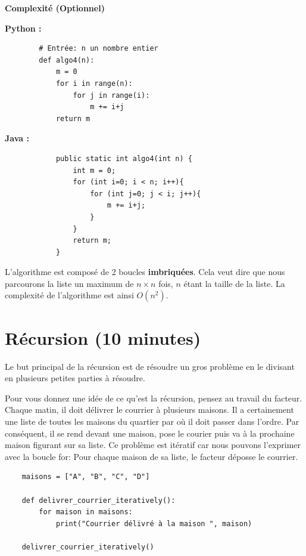 \begin{Exercice}[10 minutes] \textbf{Complexité (Optionnel)} \\        
        \item \textbf{Python :}
        \begin{verbatim}
        # Entrée: n un nombre entier
        def algo4(n):
            m = 0
            for i in range(n):
                for j in range(i):
                    m += i+j
            return m
        \end{verbatim}
        
        \textbf{Java :}
        \begin{verbatim}
            public static int algo4(int n) {
                int m = 0;
                for (int i=0; i < n; i++){
                    for (int j=0; j < i; j++){
                        m += i+j;
                    }
                }
                return m;
            }
        \end{verbatim}
    \begin{solution} 
    L'algorithme est composé de 2 boucles \textbf{imbriquées}. Cela veut dire que nous parcourons la liste un maximum de $n \times n$ fois, $n$ étant la taille de la liste. La complexité de l'algorithme est ainsi $O(n^2)$.
    \end{solution}
    
\end{Exercice}
    
        
\section{Récursion (10 minutes)}

Le but principal de la récursion est de résoudre un gros problème en le divisant en plusieurs petites parties à résoudre.

Pour vous donnez une idée de ce qu'est la récursion, pensez au travail du facteur. Chaque matin, il doit délivrer le courrier à plusieurs maisons. Il a certainement une liste de toutes les maisons du quartier par où il doit passer dans l'ordre. Par conséquent, il se rend devant une maison, pose le courier puis va à la prochaine maison figurant sur sa liste. Ce problème est itératif car nous pouvons l'exprimer avec la boucle for: Pour chaque maison de sa liste, le facteur déposse le courrier. 

\begin{verbatim}
    maisons = ["A", "B", "C", "D"]

    def delivrer_courrier_iteratively():
        for maison in maisons:
            print("Courrier délivré à la maison ", maison)
            
    delivrer_courrier_iteratively()
\end{verbatim}

